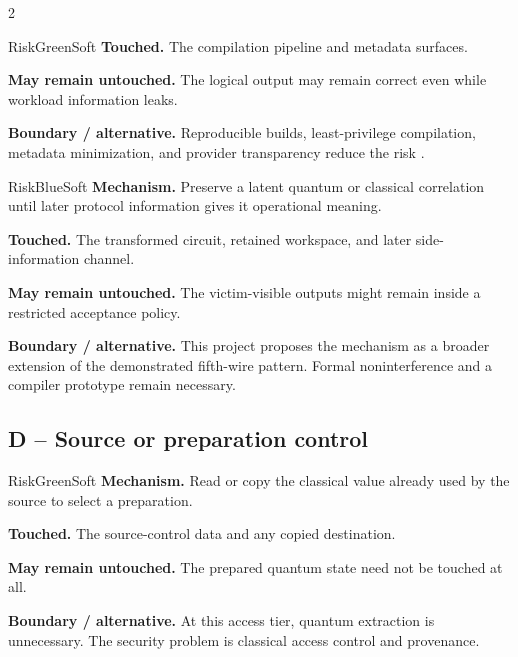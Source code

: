 \begin{multicols}{2}
\begin{matrixrecord}{RiskGreenSoft}
\textbf{Touched.} The compilation pipeline and metadata surfaces.

\textbf{May remain untouched.} The logical output may remain correct even while workload information leaks.

\textbf{Boundary / alternative.} Reproducible builds, least-privilege compilation, metadata minimization, and provider transparency reduce the risk \cite{ashsaki2023primer,xu2024pulseattacks}.

\hfill\matrixback
\end{matrixrecord}

\hypertarget{cell:C6}{}
\begin{matrixrecord}{RiskBlueSoft}
\textbf{Mechanism.} Preserve a latent quantum or classical correlation until later protocol information gives it operational meaning.

\textbf{Touched.} The transformed circuit, retained workspace, and later side-information channel.

\textbf{May remain untouched.} The victim-visible outputs might remain inside a restricted acceptance policy.

\textbf{Boundary / alternative.} This project proposes the mechanism as a broader extension of the demonstrated fifth-wire pattern. Formal noninterference and a compiler prototype remain necessary.

\hfill\matrixback
\end{matrixrecord}

\subsection*{D -- Source or preparation control}
\hypertarget{cell:D1}{}
\begin{matrixrecord}{RiskGreenSoft}
\textbf{Mechanism.} Read or copy the classical value already used by the source to select a preparation.

\textbf{Touched.} The source-control data and any copied destination.

\textbf{May remain untouched.} The prepared quantum state need not be touched at all.

\textbf{Boundary / alternative.} At this access tier, quantum extraction is unnecessary. The security problem is classical access control and provenance.


\end{matrixrecord}
\end{multicols}

